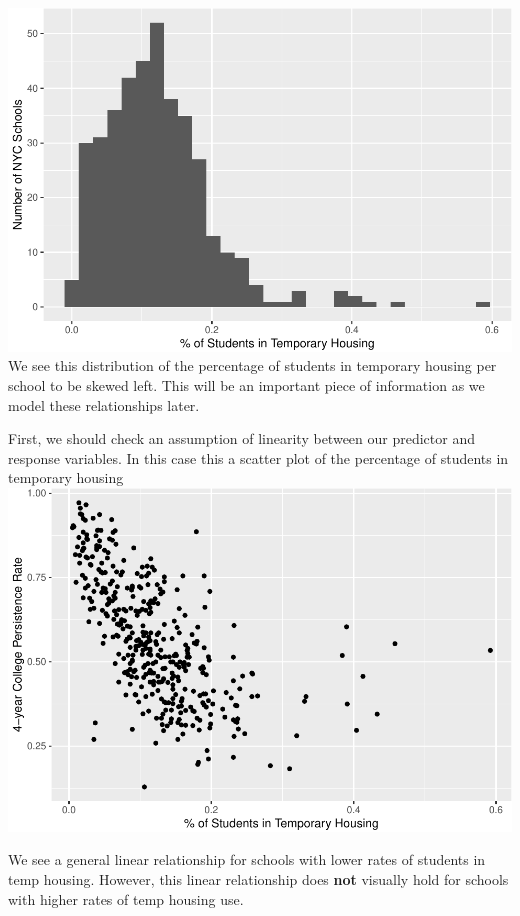 \documentclass[
  man]{apa6}
\begin{document}
\includegraphics{final-project_files/figure-latex/unnamed-chunk-3-1.pdf}
We see this distribution of the percentage of students in temporary housing per school to be skewed left. This will be an important piece of information as we model these relationships later.

First, we should check an assumption of linearity between our predictor and response variables. In this case this a scatter plot of the percentage of students in temporary housing
\includegraphics{final-project_files/figure-latex/unnamed-chunk-4-1.pdf}

We see a general linear relationship for schools with lower rates of students in temp housing. However, this linear relationship does \textbf{not} visually hold for schools with higher rates of temp housing use.
\end{document}
